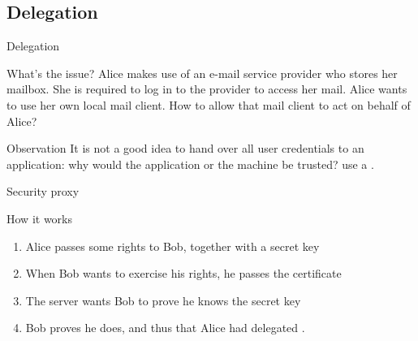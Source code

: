 \subsection{Delegation}
\begin{slide}{Delegation}
  \begin{exampleblock}{What's the issue?}
    Alice makes use of an e-mail service provider who stores her mailbox. She is required to log in to the
    provider to access her mail. Alice wants to use her own local mail client. How to allow that mail client
    to act on behalf of Alice?  
  \end{exampleblock}

  \begin{alertblock}{Observation}
    It is not a good idea to hand over all user credentials to an application: why would the application or
    the machine be trusted? \mathexpr{\Rightarrow} use a .
  \end{alertblock}

\end{slide}
\begin{slide}{Security proxy}
  \begin{centerfig}
  \end{centerfig}

  \begin{centerfig}
  \end{centerfig}

  \begin{block}{How it works}
    \begin{enumerate}\tightlist
    \item Alice passes some rights  to Bob, together with a secret key 
    \item When Bob wants to exercise his rights, he passes the certificate 
    \item The server wants Bob to prove he knows the secret key
    \item Bob proves he does, and thus that Alice had delegated .
    \end{enumerate}
  \end{block}
\end{slide}

